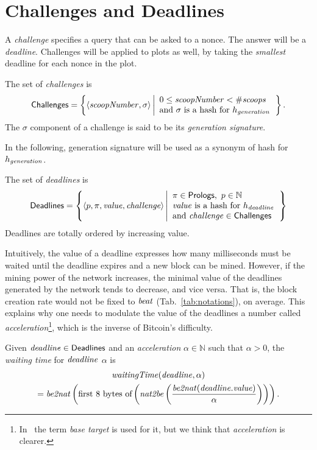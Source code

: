 \section{Challenges and Deadlines}\label{sec:challenges_and_deadlines}

A \emph{challenge} specifies a query that can be asked to a nonce.
The answer will be a \emph{deadline}.
Challenges will be applied to plots as well, by taking
the \emph{smallest} deadline for each nonce in the plot.
%
\begin{definition}[Challenge]\label{def:challenge}
  The set of \emph{challenges} is
  \[
  {\mathsf{Challenges}}=\left\{\langle{\mathit{scoopNumber}},\sigma\rangle\left|
  \begin{array}{l}
    0\le{\mathit{scoopNumber}}<{\#\mathit{scoops}}\\
    \text{and $\sigma$ is a hash for $h_{\mathit{generation}}$}
  \end{array}
  \right.\right\}.
  \]
  The $\sigma$ component of a challenge is said to be its \emph{generation signature}.
\end{definition}
%
In the following, generation signature will be used as a synonym of hash for $h_{\mathit{generation}}$.
%
\begin{definition}[Deadline]\label{def:deadline}
  The set of \emph{deadlines} is
  \[
  {\mathsf{Deadlines}}=\left\{
  \langle p,\pi,\mathit{value},{\mathit{challenge}}\rangle
  \left|\begin{array}{l}
  \pi\in{\mathsf{Prologs}},\ p\in\mathbb{N}\\
  \mathit{value}\text{ is a hash for }h_{\mathit{deadline}}\\
  \text{and }{\mathit{challenge}}\in{\mathsf{Challenges}}
  \end{array}
  \right.
  \right\}
  \]
  Deadlines are totally ordered by increasing value.
\end{definition}
%
Intuitively, the value of a deadline expresses how many milliseconds
must be waited until the deadline expires and a new block can be mined.
However, if the mining power of the network increases, the minimal value of the deadlines
generated by the network
tends to decrease, and vice versa. That is, the block creation rate would not be
fixed to ${\mathit{beat}}$ (Tab.~\ref{tab:notations}), on average.
This explains why one needs to modulate the value of the deadlines \wrt a number
called \emph{acceleration}\footnote{In~\cite{SignumPlotting} the term
\emph{base target} is used for it, but we think that \emph{acceleration} is clearer.},
which is the inverse of Bitcoin's difficulty.
%
\begin{definition}\label{def:deadline}
  Given ${\mathit{deadline}}\in{\mathsf{Deadlines}}$ and an \emph{acceleration}
  $\alpha\in\mathbb{N}$ such that $\alpha>0$, the
  \emph{waiting time} for ${\mathit{deadline}}$ \wrt $\alpha$ is
  \begin{multline*}
    {\mathit{waitingTime}}({\mathit{deadline}},\alpha)\\
    ={\mathit{be2nat}}\left(\text{first $8$ bytes of}\left({\mathit{nat2be}}\left(\frac{{\mathit{be2nat}}({\mathit{deadline}}.\mathit{value})}{\alpha}\right)\right)\right).
  \end{multline*}
\end{definition}
